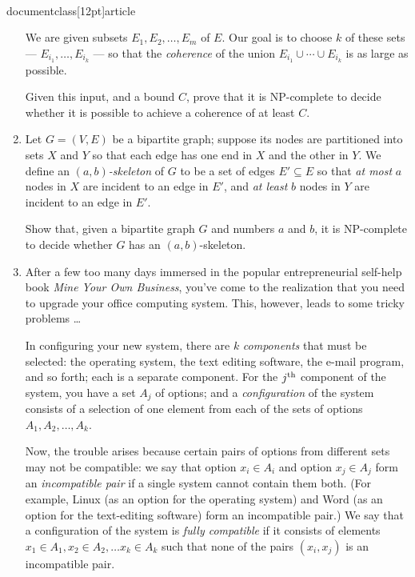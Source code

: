 \\documentclass[12pt]{article}
\begin{document}
\begin{enumerate}
We are given subsets $E_1, E_2, \ldots, E_m$ of $E$.
Our goal is to choose $k$ of these sets ---
$E_{i_1}, \ldots, E_{i_k}$ --- so that the
{\em coherence} of the union
$E_{i_1} \cup \cdots \cup E_{i_k}$ is as large as possible.

Given this input, and a bound $C$, prove that it is
NP-complete to decide whether it is possible to achieve
a coherence of at least $C$.


\item 

Let $G = (V,E)$ be a bipartite graph; suppose its nodes are
partitioned into sets $X$ and $Y$ so that each edge has one end
in $X$ and the other in $Y$.  We define an {\em $(a,b)$-skeleton}
of $G$ to be a set of edges $E' \subseteq E$ so that {\em at most}
$a$ nodes in $X$ are incident to an edge in $E'$, and {\em at least}
$b$ nodes in $Y$ are incident to an edge in $E'$.

Show that, given a bipartite graph $G$ and numbers $a$ and $b$,
it is NP-complete to decide whether $G$ has an $(a,b)$-skeleton.



\item 

After a few too many days immersed in the popular
entrepreneurial self-help book {\em Mine Your Own Business},
you've come to the realization that you need
to upgrade your office computing system.
This, however, leads to some tricky problems \ldots

In configuring your new system, there are $k$
{\em components} that must be selected:
the operating system, the text editing software,
the e-mail program, and so forth; each is a separate component.
For the $j^{\rm th}$ component of the system,
you have a set $A_j$ of options;
and a {\em configuration} of the system consists
of a selection of one element from each of the
sets of options $A_1, A_2, \ldots, A_k$.

Now, the trouble arises because
certain pairs of options from different sets
may not be compatible:
we say that option $x_i \in A_i$ and option $x_j \in A_j$
form an {\em incompatible pair} if a single system
cannot contain them both.
(For example, Linux (as an option for the operating system)
and Word (as an option for the text-editing software)
form an incompatible pair.)
We say that a configuration of the system is
{\em fully compatible} if it consists of elements
$x_1 \in A_1, x_2 \in A_2, \ldots x_k \in A_k$
such that none of the pairs $(x_i,x_j)$ is
an incompatible pair.


\end{enumerate}
\end{document}
